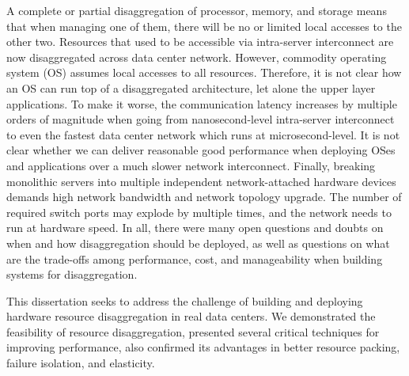 A complete or partial disaggregation of processor, memory, and
storage means that when managing one of them, there
will be no or limited local accesses to the other two.
Resources that used to be accessible via intra-server interconnect
are now disaggregated across data center network.
However, commodity operating system (OS) assumes local accesses to all resources.
Therefore, it is not clear how an OS can run top of a disaggregated architecture,
let alone the upper layer applications.
%
To make it worse,
the communication latency increases by multiple orders of magnitude
when going from nanosecond-level intra-server interconnect
to even the fastest data center network which runs at microsecond-level.
It is not clear whether we can deliver reasonable good performance when deploying
OSes and applications over a much slower network interconnect.
%
Finally, breaking monolithic servers into multiple independent network-attached
hardware devices demands high network bandwidth and network topology upgrade.
The number of required switch ports may explode by multiple times,
and the network needs to run at hardware speed.
%
In all, there were many open questions and doubts on when and how disaggregation
should be deployed, as well as questions on what are the trade-offs among performance, cost, and manageability when building systems for disaggregation.

This dissertation seeks to address the challenge of building and deploying
hardware resource disaggregation in real data centers.
We demonstrated the feasibility of resource disaggregation, 
presented several critical techniques for improving performance,
also confirmed its advantages in better resource packing, failure isolation, and elasticity.

